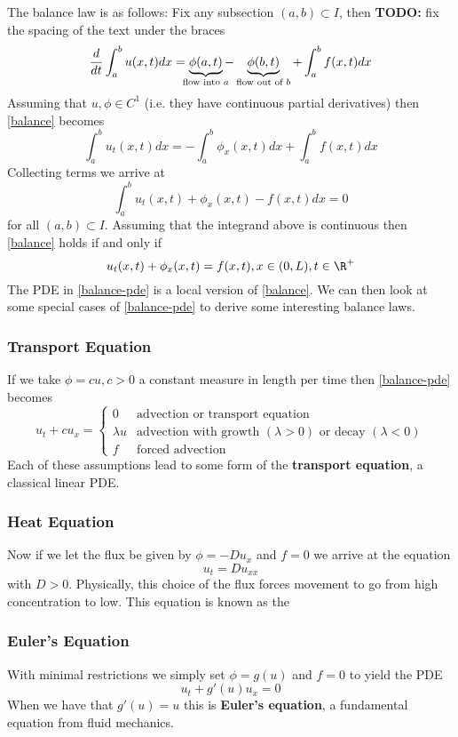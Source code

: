 \documentclass{bkcnotes}
\newcommand{\todo}[1]{{\bf TODO: } #1\\}
\begin{document}
The balance law is as follows: Fix any subsection $(a,b) \subset
I$, then
\todo{fix the spacing of the text under the braces}
\begin{equation}
  \label{eq:balance}
  \frac{d}{dt} \int_a^b u(x,t)dx =
  \underbrace{\phi(a,t)}_{\mathclap{\text{flow into } a}} -
  \underbrace{\phi(b,t)}_{\text{flow out of } b} +
  \int_a^b f(x,t)dx
\end{equation}
Assuming that $u,\phi \in C^1$ (i.e. they have continuous partial
derivatives) then \ref{balance} becomes
\[
\int_a^b u_t(x,t)dx = -\int_a^b \phi_x(x,t)dx + \int_a^b f(x,t)dx
\]
Collecting terms we arrive at
\[
\int_a^b u_t(x,t) + \phi_x(x,t) - f(x,t)dx = 0
\]
for all $(a,b) \subset I$. Assuming that the integrand above is
continuous then \ref{balance} holds if and only if
\begin{equation}
  \label{eq:balance-pde}
  u_t(x,t) + \phi_x(x,t) = f(x,t), x \in (0,L), t \in \R^+
\end{equation}
The PDE in \ref{balance-pde} is a local version of \ref{balance}. We
can then look at some special cases of \ref{balance-pde} to derive
some interesting balance laws.
\subsubsection{Transport Equation}
If we take $\phi = cu, c > 0$ a constant measure in length per time
then \ref{balance-pde} becomes
\[
u_t + cu_x =
\begin{cases}
  0         & \text{advection or transport equation} \\
  \lambda u & \text{advection with growth }(\lambda > 0)
              \text{ or decay }(\lambda < 0) \\
  f         & \text{forced advection}
\end{cases}
\]
Each of these assumptions lead to some form of the {\bf transport
  equation}, a classical linear PDE.

\subsubsection{Heat Equation}
Now if we let the flux be given by $\phi = - Du_x$ and $f = 0$ we
arrive at the equation
\[
u_t = Du_{xx}
\]
with $D > 0$. Physically, this choice of the flux forces movement to
go from high concentration to low. This equation is known as the {\bf}

\subsubsection{Euler's Equation}
With minimal restrictions we simply set $\phi = g(u)$ and $f = 0$ to
yield the PDE
\[
u_t + g'(u)u_x = 0
\]
When we have that $g'(u) = u$ this is {\bf Euler's equation}, a
fundamental equation from fluid mechanics.
\end{document}
